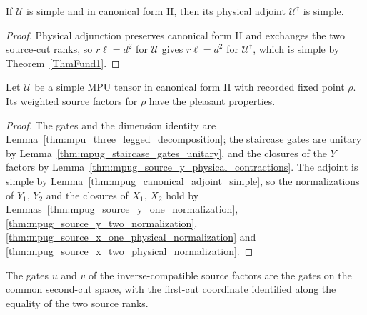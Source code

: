 \begin{lemma}
    \label{thm:mpug_canonical_adjoint_simple}
    \leanok
    If $\mathcal U$ is simple and in canonical form II, then its physical
    adjoint $\mathcal U^\dagger$ is simple.
\end{lemma}

\begin{proof}\leanok
    Physical adjunction preserves canonical form II and exchanges the two
    source-cut ranks, so $r\ell=d^2$ for $\mathcal U$ gives $r\ell=d^2$ for
    $\mathcal U^\dagger$, which is simple by Theorem~\ref{ThmFund1}.
\end{proof}

\begin{lemma}
    \label{thm:mpug_source_pleasant_properties}
    \leanok
    Let $\mathcal U$ be a simple MPU tensor in canonical form II with recorded
    fixed point $\rho$. Its weighted source factors for $\rho$ have the
    pleasant properties.
\end{lemma}

\begin{proof}\leanok
    The gates and the dimension identity are
    Lemma~\ref{thm:mpu_three_legged_decomposition}; the staircase gates are
    unitary by Lemma~\ref{thm:mpug_staircase_gates_unitary}, and the closures
    of the $Y$ factors by Lemma~\ref{thm:mpug_source_y_physical_contractions}.
    The adjoint is simple by Lemma~\ref{thm:mpug_canonical_adjoint_simple},
    so the normalizations of $Y_1$, $Y_2$ and the closures of $X_1$, $X_2$
    hold by Lemmas~\ref{thm:mpug_source_y_one_normalization},
    \ref{thm:mpug_source_y_two_normalization},
    \ref{thm:mpug_source_x_one_physical_normalization} and
    \ref{thm:mpug_source_x_two_physical_normalization}.
\end{proof}

\begin{lemma}
    \label{thm:mpug_inverse_record_gates}
    \leanok
    The gates $u$ and $v$ of the inverse-compatible source factors are the
    gates on the common second-cut space, with the first-cut coordinate
    identified along the equality of the two source ranks.
\end{lemma}


